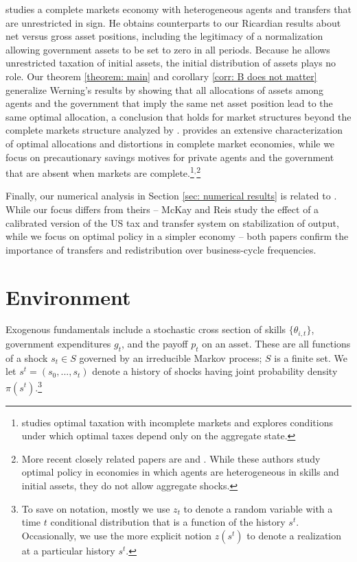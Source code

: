\documentclass[thmsb,11pt]{article}
\begin{document}
\citet{Wer07a} studies a complete markets economy with heterogeneous agents
and transfers that are unrestricted in sign. He obtains counterparts to our Ricardian
results about net versus gross asset positions, including the legitimacy of a normalization allowing government
assets to be set to zero in all periods. Because he allows unrestricted
taxation of initial assets, the initial distribution of assets plays no
role. Our theorem \ref{theorem: main} and corollary \ref{corr: B does not matter}
generalize Werning's results by showing that all allocations of assets among
agents and the government that imply the same net asset position
lead to the same optimal allocation, a conclusion that holds for market
structures beyond the complete markets structure analyzed by \citeauthor{Wer07a}.
  \citet{Wer07a} provides an extensive
characterization of optimal allocations and distortions in complete market
economies, while we focus on precautionary savings motives for private
agents and the government that are absent when markets are complete.\footnote{%
\cite{Werning2012} studies optimal taxation with incomplete markets and explores
conditions under which optimal taxes depend only on the aggregate state.}$^,$\footnote{%
More recent closely related papers are \citet{Azzimonti2008,Azzimonti2008a} and \citet{Correia2010}. While these authors study optimal policy in
 economies in which agents are heterogeneous in skills and initial assets, they
  do not allow aggregate shocks.}

  Finally, our numerical analysis in Section \ref{sec: numerical results} is related to \citet{mckay2013}. While our focus differs from theirs -- McKay and Reis study the effect of a  calibrated version of the US tax and transfer system on stabilization of output, while we focus on optimal policy  in a  simpler economy -- both papers confirm the importance of transfers and redistribution over business-cycle frequencies.





\section{Environment}
\label{Sec: environment}

Exogenous fundamentals include a stochastic
cross section of skills $\{\theta_{i,t}\}$, government expenditures $g_t$,  and the payoff $p_t$ on an asset.
These  are all functions of a shock $s_{t}\in S$
governed by an irreducible Markov process; $S$ is a finite set.
We let $s^{t}=\left(s_{0},...,s_{t}\right)$
denote a history of shocks having joint probability
 density $\pi(s^t)$.\footnote{To save on notation, mostly we use $z_{t}$ to denote a random variable
with a time $t$ conditional distribution that is a function of the
history $s^{t}$. Occasionally, we use the more explicit notion $z\left(s^{t}\right)$
to denote a realization at a particular history $s^{t}.$}
\end{document}
